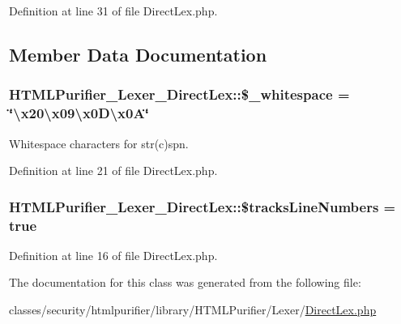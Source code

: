 Definition at line 31 of file Direct\+Lex.\+php.



\subsection{Member Data Documentation}
\hypertarget{classHTMLPurifier__Lexer__DirectLex_a0da4e3b01b4baaf3fd48269631d01006}{
\subsubsection[{\$\+\_\+whitespace}]{\setlength{\rightskip}{0pt plus 5cm}H\+T\+M\+L\+Purifier\+\_\+\+Lexer\+\_\+\+Direct\+Lex\+::\$\+\_\+whitespace = \char`\"{}\textbackslash{}x20\textbackslash{}x09\textbackslash{}x0\+D\textbackslash{}x0\+A\char`\"{}\hspace{0.3cm}{\ttfamily [protected]}}}\label{classHTMLPurifier__Lexer__DirectLex_a0da4e3b01b4baaf3fd48269631d01006}
Whitespace characters for str(c)spn. 

Definition at line 21 of file Direct\+Lex.\+php.

\hypertarget{classHTMLPurifier__Lexer__DirectLex_a273c45a399a2544879ecac2ffa3a2fd8}{
\subsubsection[{\$tracks\+Line\+Numbers}]{\setlength{\rightskip}{0pt plus 5cm}H\+T\+M\+L\+Purifier\+\_\+\+Lexer\+\_\+\+Direct\+Lex\+::\$tracks\+Line\+Numbers = true}}\label{classHTMLPurifier__Lexer__DirectLex_a273c45a399a2544879ecac2ffa3a2fd8}


Definition at line 16 of file Direct\+Lex.\+php.



The documentation for this class was generated from the following file\+:\begin{DoxyCompactItemize}
\item 
classes/security/htmlpurifier/library/\+H\+T\+M\+L\+Purifier/\+Lexer/\hyperlink{DirectLex_8php}{Direct\+Lex.\+php}\end{DoxyCompactItemize}
